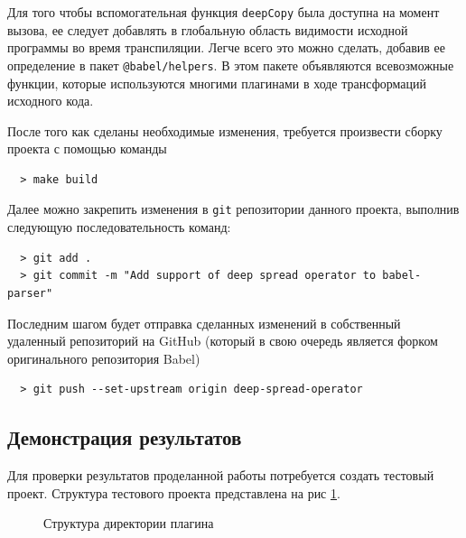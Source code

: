 \documentclass[14pt, a4paper]{article}
\def\code#1{\texttt{#1}} %
\begin{document}


Для того чтобы вспомогательная функция \code{deepCopy} была доступна на момент вызова, ее следует
добавлять в глобальную область видимости исходной программы во время транспиляции. Легче всего это можно сделать,
добавив ее определение в пакет \code{@babel/helpers}. В этом пакете объявляются всевозможные функции,
которые используются многими плагинами в ходе трансформаций исходного кода.



После того как сделаны необходимые изменения, требуется произвести сборку проекта с помощью команды
\begin{lstlisting}
  > make build
 \end{lstlisting}

Далее можно закрепить изменения в \code{git} репозитории данного проекта, выполнив следующую последовательность команд:
\begin{lstlisting}
  > git add .
  > git commit -m "Add support of deep spread operator to babel-parser"
\end{lstlisting}

Последним шагом будет отправка сделанных изменений в собственный удаленный репозиторий на GitHub (который
в свою очередь является форком оригинального репозитория Babel)
\begin{lstlisting}
  > git push --set-upstream origin deep-spread-operator
\end{lstlisting}
\subsection{Демонстрация результатов}

Для проверки результатов проделанной работы потребуется создать тестовый проект. Структура тестового проекта
представлена на рис \ref{test_struct}.
\begin{figure}[h!]
  \centering
  \caption{Структура директории плагина}
  \label{test_struct}
\end{figure}
\end{document}
